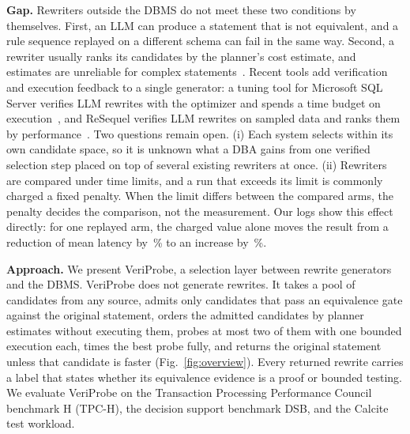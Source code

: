 \documentclass[conference]{IEEEtran}
\newcommand{\sys}{VeriProbe}
\newcommand{\pc}[1]{#1\,\%}
\begin{document}
\textbf{Gap.}
Rewriters outside the DBMS do not meet these two conditions by themselves.
First, an LLM can produce a statement that is not equivalent, and a rule sequence replayed on a different schema can fail in the same way.
Second, a rewriter usually ranks its candidates by the planner's cost estimate, and estimates are unreliable for complex statements~\cite{leis2015}.
Recent tools add verification and execution feedback to a single generator: a tuning tool for Microsoft SQL Server verifies LLM rewrites with the optimizer and spends a time budget on execution~\cite{lee2026}, and ReSequel verifies LLM rewrites on sampled data and ranks them by performance~\cite{fathollahzadeh2026}.
Two questions remain open.
(i) Each system selects within its own candidate space, so it is unknown what a DBA gains from one verified selection step placed on top of several existing rewriters at once.
(ii) Rewriters are compared under time limits, and a run that exceeds its limit is commonly charged a fixed penalty. When the limit differs between the compared arms, the penalty decides the comparison, not the measurement.
Our logs show this effect directly: for one replayed arm, the charged value alone moves the result from a reduction of mean latency by \pc{\TpchHeldQuiteRedL} to an increase by \pc{\TpchHeldQuiteIncU}.

\textbf{Approach.}
We present \sys{}, a selection layer between rewrite generators and the DBMS.
\sys{} does not generate rewrites.
It takes a pool of candidates from any source, admits only candidates that pass an equivalence gate against the original statement, orders the admitted candidates by planner estimates without executing them, probes at most two of them with one bounded execution each, times the best probe fully, and returns the original statement unless that candidate is faster (Fig.~\ref{fig:overview}).
Every returned rewrite carries a label that states whether its equivalence evidence is a proof or bounded testing.
We evaluate \sys{} on the Transaction Processing Performance Council benchmark H (TPC-H), the decision support benchmark DSB, and the Calcite test workload.
\end{document}
